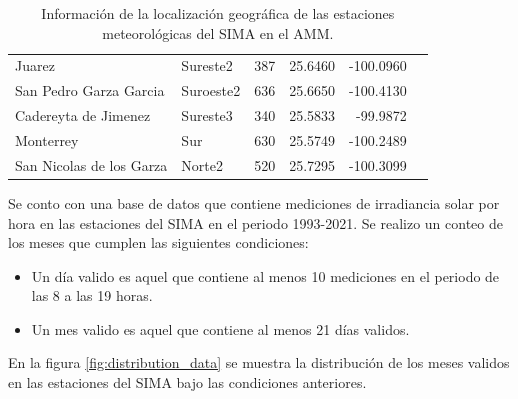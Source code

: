\begin{table}[H]
\begin{tabular}{llcrrr}
		Juarez                   & Sureste2        & 387                                                                                                                        & 25.6460               & -100.0960              \\
		San Pedro Garza Garcia   & Suroeste2       & 636                                                                                                                        & 25.6650               & -100.4130              \\
		Cadereyta de Jimenez     & Sureste3        & 340                                                                                                                        & 25.5833               & -99.9872               \\
		Monterrey                & Sur             & 630                                                                                                                        & 25.5749               & -100.2489              \\
		San Nicolas de los Garza & Norte2          & 520                                                                                                                        & 25.7295               & -100.3099              \\ \hline
	\end{tabular}
	\caption{Información de la localización geográfica de las estaciones meteorológicas del SIMA en el AMM.}
	\label{table:stations_information}
\end{table}

Se conto con una base de datos que contiene mediciones de irradiancia solar por hora en las estaciones del SIMA en el periodo 1993-2021. Se realizo un conteo de los meses que cumplen las siguientes condiciones:

\begin{itemize}
	\item Un día valido es aquel que contiene al menos 10 mediciones en el periodo de las 8 a las 19 horas.
	\item Un mes valido es aquel que contiene al menos 21 días validos.
\end{itemize}

En la figura \ref{fig:distribution_data} se muestra la distribución de los meses validos en las estaciones del SIMA bajo las condiciones anteriores.

